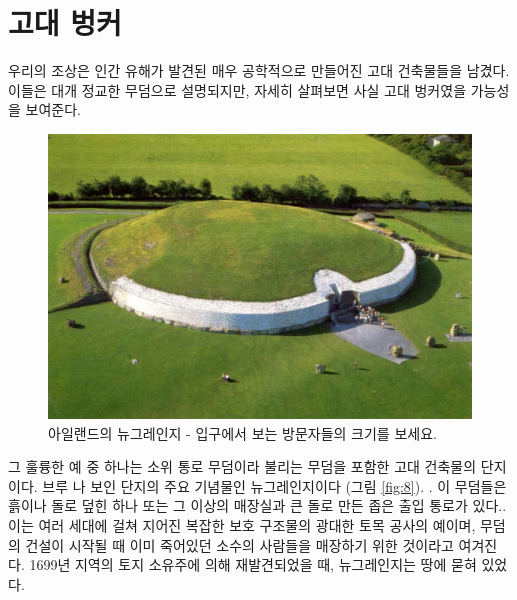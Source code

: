 \documentclass[10pt,twocolumn,letterpaper]{article}
\begin{document}
\section{고대 벙커}

우리의 조상은 인간 유해가 발견된 매우 공학적으로 만들어진 고대 건축물들을 남겼다. 이들은 대개 정교한 무덤으로 설명되지만, 자세히 살펴보면 사실 고대 벙커였을 가능성을 보여준다.

\begin{figure}[b]
\begin{center}
   \includegraphics[width=1\linewidth]{ww19.jpg}
\end{center}
   \caption{아일랜드의 뉴그레인지 - 입구에서 보는 방문자들의 크기를 보세요.}
\label{fig:8}
\label{fig:onecol}
\end{figure}

그 훌륭한 예 중 하나는 소위 통로 무덤이라 불리는 무덤을 포함한 고대 건축물의 단지이다. 브루 나 보인 단지의 주요 기념물인 뉴그레인지이다 (그림 \ref{fig:8}). . 이 무덤들은 흙이나 돌로 덮힌 하나 또는 그 이상의 매장실과  큰 돌로 만든 좁은 출입 통로가 있다.\cite{70}. 이는 여러 세대에 걸쳐 지어진 복잡한 보호 구조물의 광대한 토목 공사의 예이며, 무덤의 건설이 시작될 때 이미 죽어있던 소수의 사람들을 매장하기 위한 것이라고 여겨진다. 1699년 지역의 토지 소유주에 의해 재발견되었을 때, 뉴그레인지는 땅에 묻혀 있었다.
\end{document}
